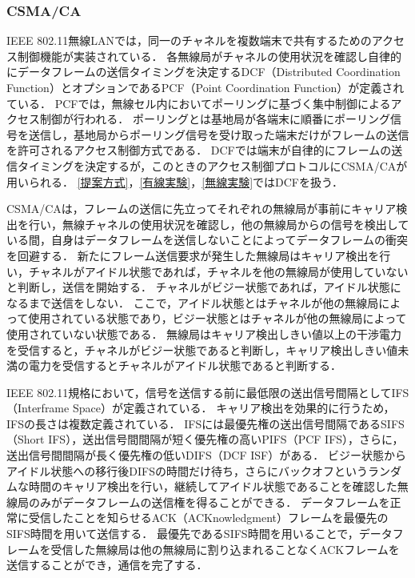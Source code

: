 \documentclass[master]{kuisthesis}		%
\begin{document}

\subsubsection{CSMA/CA}
IEEE 802.11無線LANでは，同一のチャネルを複数端末で共有するためのアクセス制御機能が実装されている．
各無線局がチャネルの使用状況を確認し自律的にデータフレームの送信タイミングを決定するDCF（Distributed Coordination Function）とオプションであるPCF（Point Coordination Function）が定義されている．
PCFでは，無線セル内においてポーリングに基づく集中制御によるアクセス制御が行われる．
ポーリングとは基地局が各端末に順番にポーリング信号を送信し，基地局からポーリング信号を受け取った端末だけがフレームの送信を許可されるアクセス制御方式である．
DCFでは端末が自律的にフレームの送信タイミングを決定するが，このときのアクセス制御プロトコルにCSMA/CAが用いられる．
\ref{提案方式}，\ref{有線実験}，\ref{無線実験}ではDCFを扱う．

CSMA/CAは，フレームの送信に先立ってそれぞれの無線局が事前にキャリア検出を行い，無線チャネルの使用状況を確認し，他の無線局からの信号を検出している間，自身はデータフレームを送信しないことによってデータフレームの衝突を回避する．
新たにフレーム送信要求が発生した無線局はキャリア検出を行い，チャネルがアイドル状態であれば，チャネルを他の無線局が使用していないと判断し，送信を開始する．
チャネルがビジー状態であれば，アイドル状態になるまで送信をしない．
ここで，アイドル状態とはチャネルが他の無線局によって使用されている状態であり，ビジー状態とはチャネルが他の無線局によって使用されていない状態である．
無線局はキャリア検出しきい値以上の干渉電力を受信すると，チャネルがビジー状態であると判断し，キャリア検出しきい値未満の電力を受信するとチャネルがアイドル状態であると判断する．

IEEE 802.11規格において，信号を送信する前に最低限の送出信号間隔としてIFS（Interframe Space）が定義されている．
キャリア検出を効果的に行うため，IFSの長さは複数定義されている．
IFSには最優先権の送出信号間隔であるSIFS（Short IFS），送出信号間間隔が短く優先権の高いPIFS（PCF IFS），さらに，送出信号間間隔が長く優先権の低いDIFS（DCF ISF）がある．
ビジー状態からアイドル状態への移行後DIFSの時間だけ待ち，さらにバックオフというランダムな時間のキャリア検出を行い，継続してアイドル状態であることを確認した無線局のみがデータフレームの送信権を得ることができる．
データフレームを正常に受信したことを知らせるACK（ACKnowledgment）フレームを最優先のSIFS時間を用いて送信する．
最優先であるSIFS時間を用いることで，データフレームを受信した無線局は他の無線局に割り込まれることなくACKフレームを送信することができ，通信を完了する．
\end{document}

